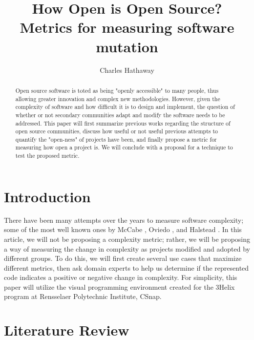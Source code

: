\documentclass[]{article}
\title{How Open is Open Source? Metrics for measuring software mutation}
\author{Charles Hathaway}
\begin{document}
\maketitle

\begin{abstract}

Open source software is toted as being "openly accessible" to many people, thus allowing greater innovation and complex new methodologies.
However, given the complexity of software and how difficult it is to design and implement, the question of whether or not secondary communities adapt and modify the software needs to be addressed.
This paper will first summarize previous works regarding the structure of open source communities, discuss how useful or not useful previous attempts to quantify the "open-ness" of projects have been, and finally propose a metric for measuring how open a project is.
We will conclude with a proposal for a technique to test the proposed metric.

\end{abstract}

\section{Introduction}


There have been many attempts over the years to measure software complexity; some of the most well known ones by McCabe \cite{ref:a_complexity_measure}, Oviedo \cite{ref:oviedo1993control}, and Halstead \cite{ref:halstead1977elements}.
In this article, we will not be proposing a complexity metric; rather, we will be proposing a way of measuring the change in complexity as projects modified and adopted by different groups.
To do this, we will first create several use cases that maximize different metrics, then ask domain experts to help us determine if the represented code indicates a positive or negative change in complexity.
For simplicity, this paper will utilize the visual programming environment created for the 3Helix program at Rensselaer Polytechnic Institute, CSnap.

\section{Literature Review}
\end{document}
